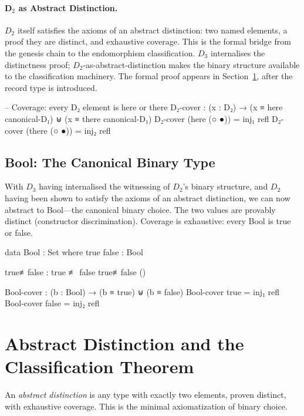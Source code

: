 \documentclass[11pt,a4paper]{article}
\begin{document}
\paragraph{D$_2$ as Abstract Distinction.}
$D_2$ itself satisfies the axioms of an abstract distinction:
two named elements, a proof they are distinct, and exhaustive coverage.
This is the formal bridge from the genesis chain to the endomorphism
classification. $D_3$ internalises the distinctness proof;
$D_2$-as-abstract-distinction makes the binary structure available
to the classification machinery. The formal proof appears in
Section~\ref{sec:endocase}, after the record type is introduced.

\begin{code}
-- Coverage: every D₂ element is here or there
D₂-cover : (x : D₂) → (x ≡ here canonical-D₁) ⊎ (x ≡ there canonical-D₁)
D₂-cover (here  (○ ●)) = inj₁ refl
D₂-cover (there (○ ●)) = inj₂ refl
\end{code}

\subsection{Bool: The Canonical Binary Type}

With $D_3$ having internalised the witnessing of $D_2$'s binary structure,
and $D_2$ having been shown to satisfy the axioms of an abstract distinction,
we can now abstract to Bool---the canonical binary choice.
The two values are provably distinct (constructor discrimination).
Coverage is exhaustive: every Bool is true or false.

\begin{code}
data Bool : Set where
  true false : Bool

true≢false : true ≢ false
true≢false ()

Bool-cover : (b : Bool) → (b ≡ true) ⊎ (b ≡ false)
Bool-cover true  = inj₁ refl
Bool-cover false = inj₂ refl
\end{code}

\section{Abstract Distinction and the Classification Theorem}
\label{sec:endocase}

An \emph{abstract distinction} is any type with exactly two elements,
proven distinct, with exhaustive coverage. This is the minimal
axiomatization of binary choice.
\end{document}
